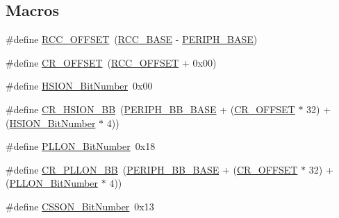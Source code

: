 \subsection*{Macros}
\begin{DoxyCompactItemize}
\item 
\#define \hyperlink{group___r_c_c___private___defines_ga539e07c3b3c55f1f1d47231341fb11e1}{R\+C\+C\+\_\+\+O\+F\+F\+S\+ET}~(\hyperlink{group___peripheral__memory__map_ga0e681b03f364532055d88f63fec0d99d}{R\+C\+C\+\_\+\+B\+A\+SE} -\/ \hyperlink{group___peripheral__memory__map_ga9171f49478fa86d932f89e78e73b88b0}{P\+E\+R\+I\+P\+H\+\_\+\+B\+A\+SE})
\item 
\#define \hyperlink{group___r_c_c___private___defines_gafa1d3d0ea72132df651c76fc1bdffffc}{C\+R\+\_\+\+O\+F\+F\+S\+ET}~(\hyperlink{group___r_c_c___private___defines_ga539e07c3b3c55f1f1d47231341fb11e1}{R\+C\+C\+\_\+\+O\+F\+F\+S\+ET} + 0x00)
\item 
\#define \hyperlink{group___r_c_c___private___defines_ga3d3085e491cbef815d223afbe5bf1930}{H\+S\+I\+O\+N\+\_\+\+Bit\+Number}~0x00
\item 
\#define \hyperlink{group___r_c_c___private___defines_gac3290a833c0e35ec17d32c2d494e6133}{C\+R\+\_\+\+H\+S\+I\+O\+N\+\_\+\+BB}~(\hyperlink{group___peripheral__memory__map_gaed7efc100877000845c236ccdc9e144a}{P\+E\+R\+I\+P\+H\+\_\+\+B\+B\+\_\+\+B\+A\+SE} + (\hyperlink{group___r_c_c___private___defines_gafa1d3d0ea72132df651c76fc1bdffffc}{C\+R\+\_\+\+O\+F\+F\+S\+ET} $\ast$ 32) + (\hyperlink{group___r_c_c___private___defines_ga3d3085e491cbef815d223afbe5bf1930}{H\+S\+I\+O\+N\+\_\+\+Bit\+Number} $\ast$ 4))
\item 
\#define \hyperlink{group___r_c_c___private___defines_gab24d7f5f8e4b3b717fd91b54f393f6a3}{P\+L\+L\+O\+N\+\_\+\+Bit\+Number}~0x18
\item 
\#define \hyperlink{group___r_c_c___private___defines_ga3f1fb2589cb8b5ac2f7121aba1135a5f}{C\+R\+\_\+\+P\+L\+L\+O\+N\+\_\+\+BB}~(\hyperlink{group___peripheral__memory__map_gaed7efc100877000845c236ccdc9e144a}{P\+E\+R\+I\+P\+H\+\_\+\+B\+B\+\_\+\+B\+A\+SE} + (\hyperlink{group___r_c_c___private___defines_gafa1d3d0ea72132df651c76fc1bdffffc}{C\+R\+\_\+\+O\+F\+F\+S\+ET} $\ast$ 32) + (\hyperlink{group___r_c_c___private___defines_gab24d7f5f8e4b3b717fd91b54f393f6a3}{P\+L\+L\+O\+N\+\_\+\+Bit\+Number} $\ast$ 4))
\item 
\#define \hyperlink{group___r_c_c___private___defines_ga253fa44d87aabc55f0cd6628e77a51fd}{C\+S\+S\+O\+N\+\_\+\+Bit\+Number}~0x13
\item 

\end{DoxyCompactItemize}
